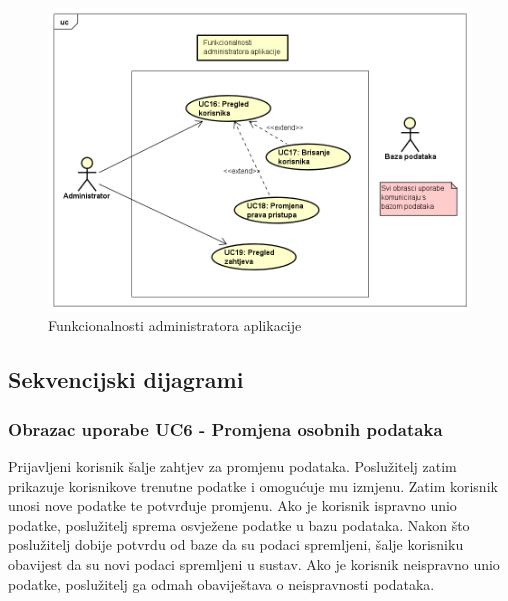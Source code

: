 					\begin{figure}[H]
						\includegraphics[width=1\linewidth]{slike/Administrator.PNG}
						\centering
						\caption{Funkcionalnosti administratora aplikacije}
						\label{fig:funkcionalnosti_administrator}
					\end{figure}
				\eject		
				
			\subsection{Sekvencijski dijagrami}
				

				
				\subsubsection{Obrazac uporabe UC6 - Promjena osobnih podataka}
				Prijavljeni korisnik šalje zahtjev za promjenu podataka. Poslužitelj zatim prikazuje korisnikove trenutne podatke i omogućuje mu izmjenu. Zatim korisnik unosi nove podatke te potvrđuje promjenu. Ako je korisnik ispravno unio podatke, poslužitelj sprema osvježene podatke u bazu podataka. Nakon što poslužitelj dobije potvrdu od baze da su podaci spremljeni, šalje korisniku obavijest da su novi podaci spremljeni u sustav. Ako je korisnik neispravno unio podatke, poslužitelj ga odmah obaviještava o neispravnosti podataka.
				
